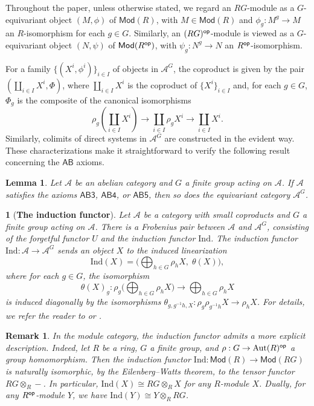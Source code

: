 \documentclass[12pt,twoside]{amsart}
\theoremstyle{bfupright head,slanted body}
\theoremstyle{bfupright head,upright body}
\newtheorem{bfhpg}[res]{}               \newtheorem*{bfhpg*}{}
\theoremstyle{fixed bf head,slanted body}
\newtheorem{lem}[res]{Lemma}            \newtheorem*{lem*}{Lemma}
\theoremstyle{fixed bf head,upright body}
\newtheorem{rmk}[res]{Remark}           \newtheorem*{rmk*}{Remark}
\theoremstyle{numbered paragraph}
\numberwithin{equation}{res}
\newcommand{\calA}{\mathcal{A}}
\newcommand{\Mod}{\mathsf{Mod}}
\newcommand{\Ind}{\mathrm{Ind}}
\newcommand{\op}{\sf op}
\begin{document}
{\sf Throughout the paper}, unless otherwise stated, we regard an \(RG\)-module as a \(G\)-equivariant object \((M,\phi)\) of \(\Mod(R)\), with \(M\in\Mod(R)\) and \(\phi_g:M^g\to M\) an \(R\)-isomorphism for each \(g\in G\).
Similarly, an \((RG)^{\op}\)-module is viewed as a \(G\)-equivariant object \((N,\psi)\) of \(\Mod(R^{\op})\), with \(\psi_g:N^g\to N\) an \(R^{\op}\)-isomorphism.

For a family \(\{(X^i,\phi^i)\}_{i\in I}\) of objects in \(\calA^G\), the coproduct is given by the pair \((\coprod_{i\in I}X^i,\Phi)\), where \(\coprod_{i\in I}X^i\) is the coproduct of \(\{X^i\}_{i\in I}\) and, for each \(g\in G\), \(\Phi_g\) is the composite of the canonical isomorphisms
\[
\rho_g(\coprod_{i\in I}X^i) \longrightarrow \coprod_{i\in I}\rho_g X^i \longrightarrow \coprod_{i\in I}X^i.
\]
Similarly, colimits of direct systems in \(\calA^G\) are constructed in the evident way.
These characterizations make it straightforward to verify the following result concerning the \(\textsf{AB}\) axioms.

\begin{lem} \label{prp of AB345}
Let \(\calA\) be an abelian category and \(G\) a finite group acting on \(\calA\).
If \(\calA\) satisfies the axioms \(\textsf{AB3}\), \(\textsf{AB4}\), or \(\textsf{AB5}\), then so does the equivariant category \(\calA^G\).
\end{lem}

\begin{bfhpg}[\bf The induction functor]\label{frobenius pair (Ind,w)}
Let \(\calA\) be a category with small coproducts and \(G\) a finite group acting on \(\calA\).
There is a Frobenius pair between \(\calA\) and \(\calA^G\), consisting of the \emph{forgetful} functor \(U\) and the \emph{induction} functor \(\Ind\).
The induction functor \(\Ind:\calA\to\calA^G\) sends an object \(X\) to the induced linearization
\[
\Ind(X)=\bigl(\bigoplus_{h\in G}\rho_h X,\; \theta(X)\bigr),
\]
where for each \(g\in G\), the isomorphism
\[
\theta(X)_g : \rho_g\bigl(\bigoplus_{h\in G}\rho_h X\bigr)
\rightarrow
              \bigoplus_{h\in G}\rho_h X
\]
is induced diagonally by the isomorphisms
\(\theta_{g,g^{-1}h,X}:\rho_g\rho_{g^{-1}h}X \to \rho_h X\).
For details, we refer the reader to \cite[Lemma 3.8]{2014Elag} or \cite[Lemma 4.6]{2010DGNO}.
\end{bfhpg}

\begin{rmk} \label{watts thm}
In the module category, the induction functor admits a more explicit description.
Indeed, let \(R\) be a ring, \(G\) a finite group, and \(\rho:G\to\operatorname{Aut}(R)^{\op}\) a group homomorphism.
Then the induction functor \(\Ind:\Mod(R)\to\Mod(RG)\) is naturally isomorphic, by the Eilenberg--Watts theorem, to the tensor functor \(RG\otimes_R -\).
In particular, \(\Ind(X)\cong RG\otimes_R X\) for any \(R\)-module \(X\).
Dually, for any \(R^{\op}\)-module \(Y\), we have \(\Ind(Y)\cong Y\otimes_R RG\).
\end{rmk}
\end{document}
